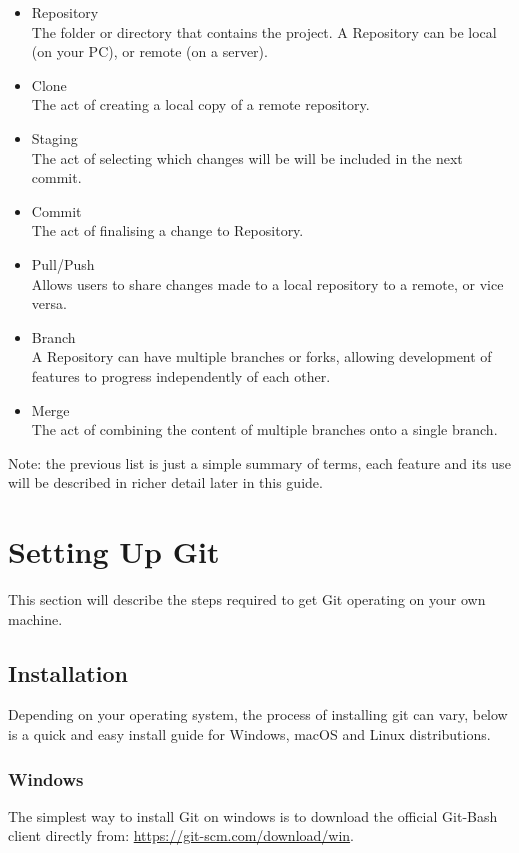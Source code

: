 \documentclass[11pt, a4paper, titlepage]{article}
\begin{document}
\begin{itemize} 
\item Repository \\ 
The folder or directory that contains the project. 
A Repository can be local (on your PC), or remote (on a server).
\item Clone \\ 
The act of creating a local copy of a remote repository.
\item Staging \\
The act of selecting which changes will be will be included in the next
commit.
\item Commit \\ 
The act of finalising a change to Repository.  
\item Pull/Push \\ 
Allows users to share changes made to a local repository to a remote, or vice
versa.  
\item Branch \\ 
A Repository can have multiple branches or forks, allowing development of
features to progress independently of each other.
\item Merge \\ 
The act of combining the content of multiple branches onto a single branch.
\end{itemize}

Note: the previous list is just a simple summary of terms, each feature and
its use will be described in richer detail later in this guide.



\section{Setting Up Git}
This section will describe the steps required to get Git operating on your own
machine. 


\subsection{Installation}
Depending on your operating system, the process of installing git can vary,
below is a quick and easy install guide for Windows, macOS and Linux
distributions.

\subsubsection{Windows}
The simplest way to install Git on windows is to download the official Git-Bash
client directly from: \url{https://git-scm.com/download/win}.
\end{document}

